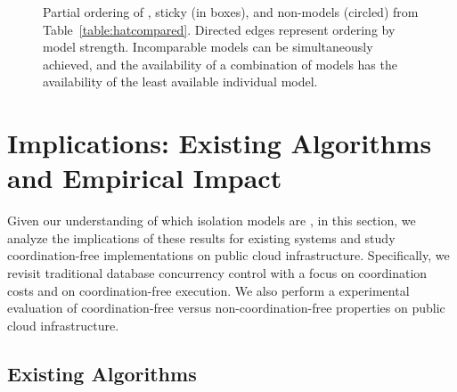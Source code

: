 \begin{figure}[t!]
\vspace{.75em}
\label{fig:hat-order}
\caption{Partial ordering of \iconfluent, sticky (in boxes), and
  non-\iconfluent models (circled) from
  Table~\protect\ref{table:hatcompared}. Directed edges represent
  ordering by model strength. Incomparable models can be
  simultaneously achieved, and the availability of a combination of
  models has the availability of the least available individual
  model.}
\label{fig:hatcompared}
\end{figure}



\section{Implications: Existing Algorithms and Empirical Impact}
\label{sec:hat-evaluation}

Given our understanding of which isolation models are \iconfluent, in
this section, we analyze the implications of these results for
existing systems and study coordination-free implementations on public
cloud infrastructure. Specifically, we revisit traditional database
concurrency control with a focus on coordination costs and on
coordination-free execution. We also perform a experimental evaluation
of coordination-free versus non-coordination-free properties on public
cloud infrastructure.

\subsection{Existing Algorithms}
\label{sec:eval-existing}

